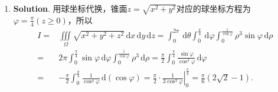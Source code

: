 \documentclass[../main.tex]{subfiles}
\begin{document}
\begin{enumerate}
          \textbf{Solution}. 斜边的方程为$4x+3y = 12$，即$\frac{1}{3}x+\frac{1}{4}y=1$，令$\begin{cases}
                  u = \frac{1}{3}x+\frac{1}{4}y, \\
                  v = \frac{\frac{1}{4}y}{\frac{1}{3}x+\frac{1}{4}y}
              \end{cases}$，

          则$\begin{cases}
                  x = 3u(1-v), \\
                  y = 4uv
              \end{cases}$，$|J| = \left|
              \begin{vmatrix}
                  3(1-v) & -3u \\
                  4v     & 4u
              \end{vmatrix}\right| = 12u$. 故
          \[
              \begin{aligned}
                  I = {} & \iint\limits_{D}x^{2} y\,\mathrm{d}x\,\mathrm{d}y = \int_{0}^{1}\,\mathrm{d}u\int_{0}^{1}\left[3u(1-v)\right]^{2} \cdot 4uv \cdot 12u\,\mathrm{d}v \\
                  = {}   & 432\int_{0}^{1}u^{4}\,\mathrm{d}u\int_{0}^{1}v(1-v)^{2}\,\mathrm{d}v = 432\cdot\frac{1}{5}\cdot\frac{2!}{4!}= \frac{36}{5}.
              \end{aligned}
          \]

    \item \textbf{Solution}. 用球坐标代换，锥面$z=\sqrt{x^{2}+y^{2}}$对应的球坐标方程为$\varphi
              = \frac{\pi}{4}(z\geq 0)$，所以
          \[
              \begin{aligned}
                  I = {} & \iiint\limits_{\Omega}\sqrt{x^2+y^2+z^2}\,\mathrm{d}x\,\mathrm{d}y\,\mathrm{d}z = \int_{0}^{2\pi}\,\mathrm{d}\theta\int_{0}^{\frac{\pi}{4}}\,\mathrm{d}\varphi\int_{0}^{\frac{1}{\cos \varphi}}\rho^{3}\sin \varphi\,\mathrm{d}\rho \\
                  = {}   & 2\pi\int_{0}^{\frac{\pi}{4}}\sin \varphi\,\mathrm{d}\varphi\int_{0}^{\frac{1}{\cos \varphi}}\rho^{3}\,\mathrm{d}\rho = \frac{\pi}{2}\int_{0}^{\frac{\pi}{4}}\frac{\sin \varphi}{\cos^{4} \varphi}\,\mathrm{d}\varphi                \\
                  = {}   & -\frac{\pi}{2}\int_{0}^{\frac{\pi}{4}}\frac{1}{\cos^4 \varphi}\,\mathrm{d}(\cos \varphi) = \left.\frac{\pi}{2}\cdot \frac{1}{3\cos^{3} \varphi}\right|_{0}^{\frac{\pi}{4}}= \frac{\pi}{6}\left(2\sqrt{2}-1\right).
              \end{aligned}
          \]


\end{enumerate}
\end{document}
